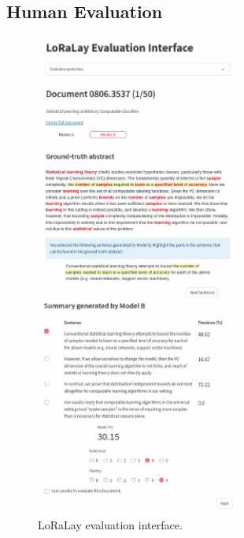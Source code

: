 \subsection{Human Evaluation}

\begin{figure}[H]
    \centering
    \includegraphics[width=0.6\textwidth]{images/chapter5/interface_snapshot.pdf}
  \caption{LoRaLay evaluation interface.}
  \label{fig:loralay-eval-interface}
\end{figure}


